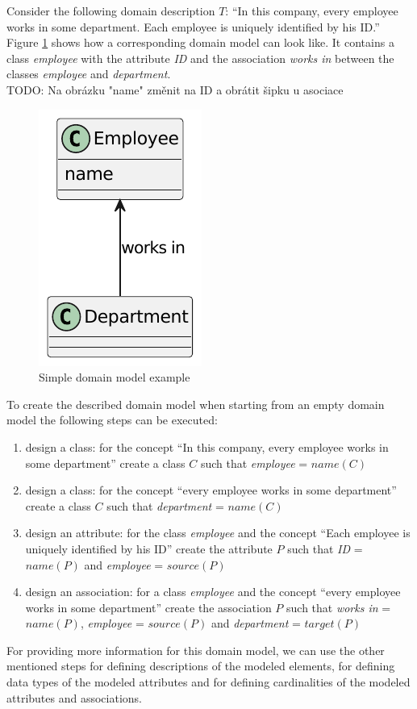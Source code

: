 Consider the following domain description $T$: ``In this company, every employee works in some department. Each employee is uniquely identified by his ID.'' Figure \ref{fig:simple-employee-domain-model} shows how a corresponding domain model can look like. It contains a class \textit{employee} with the attribute \textit{ID} and the association \textit{works in} between the classes \textit{employee} and \textit{department}. \\

TODO: Na obrázku "name" změnit na ID a obrátit šipku u asociace \\

\begin{figure}[!h]
    \centering
    \includegraphics[scale=1.00]{img/domain-modeling-steps-example.pdf}
    \caption{\centering Simple domain model example}
    \label{fig:simple-employee-domain-model}
\end{figure}

To create the described domain model when starting from an empty domain model the following steps can be executed:

\begin{enumerate}
\item design a class: for the concept ``In this company, every employee works in some department'' create a class $C$ such that \textit{employee} = $name(C)$
\item design a class: for the concept ``every employee works in some department'' create a class $C$ such that \textit{department} = $name(C)$
\item design an attribute: for the class \textit{employee} and the concept ``Each employee is uniquely identified by his ID'' create the attribute $P$ such that \textit{ID} = $name(P)$ and \textit{employee} = $source(P)$
\item design an association: for a class \textit{employee} and the concept ``every employee works in some department'' create the association $P$ such that \textit{works in} = $name(P)$, \textit{employee} = $source(P)$ and \textit{department} = $target(P)$
\end{enumerate}

For providing more information for this domain model, we can use the other mentioned steps for defining descriptions of the modeled elements, for defining data types of the modeled attributes and for defining cardinalities of the modeled attributes and associations.